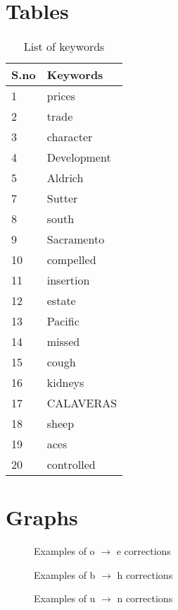 \documentclass{sig-alternate}
\begin{document}
\section{Tables}
\begin{table*}[ht]
\centering
\caption{List of keywords}
\begin{tabular}{| l | l |}
\hline
 S.no  & Keywords\\
\hline
1 & prices\\
2 & trade \\
3 & character \\
4 & Development \\
5 & Aldrich \\
7 & Sutter \\
8 & south \\
9 & Sacramento \\
10 & compelled \\
11 & insertion \\
12 & estate \\
13 & Pacific \\
14 & missed \\
15 & cough \\
16 & kidneys \\
17 & CALAVERAS \\
18 & sheep \\
19 & aces \\
20 & controlled \\
\hline
\end{tabular}
\label{table:keywords}
\end{table*}


\section{Graphs}
\begin{figure*}[ht]
\centering
{}
\label{fig:o_e}
\caption{Examples of o $\rightarrow$ e corrections}
\end{figure*}

\begin{figure*}[ht]
\centering
{}
\label{fig:b_h}
\caption{Examples of b $\rightarrow$ h corrections}
\end{figure*}

\begin{figure*}[ht]
\centering
{}
\label{fig:u_n}
\caption{Examples of u $\rightarrow$ n corrections}
\end{figure*}
\end{document}
